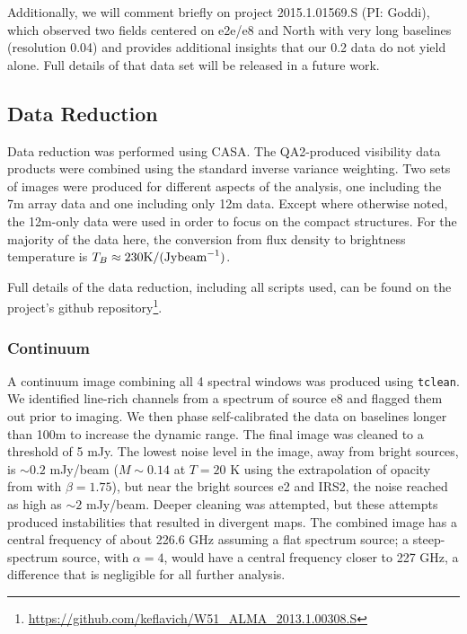 \documentclass{emulateapj}
\begin{document}

Additionally, we will comment briefly on project 2015.1.01569.S (PI: Goddi),
which observed two fields centered on e2e/e8 and North with very long baselines
(resolution 0.04\arcsec) and provides additional insights that our 0.2\arcsec
data do not yield alone.  Full details of that data set will be released in a
future work.



\subsection{Data Reduction}
Data reduction was performed using CASA.  The QA2-produced visibility data
products were
combined using the standard inverse variance weighting.  Two sets of images
were produced for different aspects of the analysis, one including the 7m array
data and one including only 12m data.  Except where otherwise noted, the
12m-only data were used in order to focus on the compact structures.
For the majority of the data here, the conversion from flux density to
brightness temperature is $T_B \approx 230 \mathrm{K}/(\mathrm{Jy} \textrm{beam}^{-1})$.

Full details of the data reduction, including all scripts used, can be found
on the project's github repository\footnote{\url{https://github.com/keflavich/W51_ALMA_2013.1.00308.S}}.


\subsubsection{Continuum}
A continuum image combining all 4 spectral windows was produced using
\texttt{tclean}.  We identified line-rich channels from a spectrum of source e8
and flagged them out prior to imaging.  We then phase self-calibrated the data
on baselines longer than 100m to increase the dynamic range.  The final image
was cleaned to a threshold of 5 mJy.  The lowest noise
level in the image, away from bright sources, is $\sim0.2$ mJy/beam
($M\sim0.14$ \msun at $T=20$ K using the extrapolation of
\citet{Ossenkopf1994a} opacity from \citet{Aguirre2011a} with $\beta=1.75$),
but near the bright sources e2 and IRS2, the noise reached as high as $\sim2$
mJy/beam.  Deeper cleaning was attempted, but these attempts produced
instabilities that resulted in divergent maps.  The combined image has a central
frequency of about 226.6 GHz assuming a flat spectrum source; a steep-spectrum
source, with $\alpha=4$, would have a central frequency closer to 227 GHz, a
difference that is negligible for all further analysis.
\end{document}
